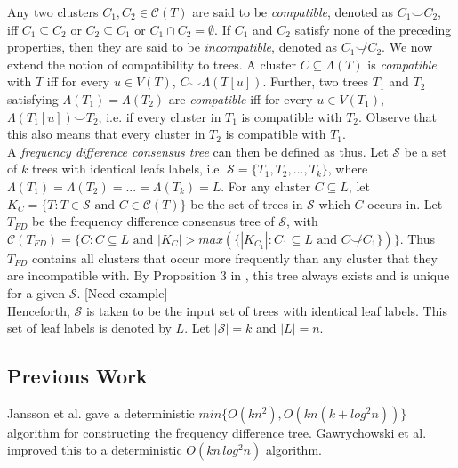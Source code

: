 \documentclass{article}
\newcommand{\compatible}{\smile}
\newcommand{\leafset}{\Lambda}
\begin{document}
    Any two clusters $C_1, C_2 \in \mathcal{C}(T)$ are said to be \textit{compatible}, denoted as $C_1 \compatible C_2$, iff $C_1 \subseteq C_2$ or $C_2 \subseteq C_1$ or $C_1 \cap C_2 = \emptyset$. If $C_1$ and $C_2$ satisfy none of the preceding properties, then they are said to be \textit{incompatible}, denoted as $C_1 \not\compatible C_2$. We now extend the notion of compatibility to trees. A cluster $C \subseteq \leafset(T)$ is \textit{compatible} with $T$ iff for every $u \in V(T)$, $C \compatible \leafset(T[u])$. Further, two trees $T_1$ and $T_2$ satisfying $\leafset(T_1) = \leafset(T_2)$ are \textit{compatible} iff for every $u \in V(T_1)$, $\leafset(T_1[u]) \compatible T_2$, i.e. if every cluster in $T_1$ is compatible with $T_2$. Observe that this also means that every cluster in $T_2$ is compatible with $T_1$.\\

    A \textit{frequency difference consensus tree} can then be defined as thus. Let $\mathcal{S}$ be a set of $k$ trees with identical leafs labels, i.e. $\mathcal{S} = \{T_1, T_2, ..., T_k\}$, where $\leafset(T_1) = \leafset(T_2) = ... = \leafset(T_k) = L$. For any cluster $C \subseteq L$, let $K_C = \{T : T \in \mathcal{S} \text{ and } C \in \mathcal{C}(T)\}$ be the set of trees in $\mathcal{S}$ which $C$ occurs in. Let $T_{FD}$ be the frequency difference consensus tree of $\mathcal{S}$, with $\mathcal{C}(T_{FD}) = \{C : C \subseteq L \text{ and } |K_C| > max(\{|K_{C_1}| : C_1 \subseteq L \text{ and } C \not\compatible C_1\})\}$. Thus $T_{FD}$ contains all clusters that occur more frequently than any cluster that they are incompatible with. By Proposition $3$ in \cite{steel2014axiomatic}, this tree always exists and is unique for a given $\mathcal{S}$. [Need example]\\

    Henceforth, $\mathcal{S}$ is taken to be the input set of trees with identical leaf labels. This set of leaf labels is denoted by $L$. Let $|\mathcal{S}| = k$ and $|L| = n$.

    \subsection{Previous Work}
    Jansson et al. \cite{jansson2018algorithms} gave a deterministic $min\{O(kn^2), O(kn(k + log^2 n))\}$ algorithm for constructing the frequency difference tree. Gawrychowski et al. \cite{gawrychowski2017faster} improved this to a deterministic $O(kn\,log^2n)$ algorithm.
\end{document}
